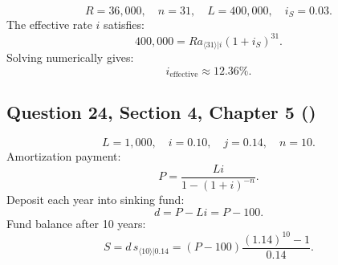 \documentclass[12pt, a4paper]{article}
\newcommand{\angl}[1]{\langle #1 \rangle}
\begin{document}
\[
R = 36{,}000, \quad n = 31, \quad L = 400{,}000, \quad i_S = 0.03.
\]
The effective rate \(i\) satisfies:
\[
400{,}000 = R a_{\angl{31}|i}(1 + i_S)^{31}.
\]
Solving numerically gives:
\[
i_{\text{effective}} \approx 12.36\%.
\]

\subsection*{Question 24, Section 4, Chapter 5  (\cite{toi3rd})}

\[
L = 1{,}000, \quad i = 0.10, \quad j = 0.14, \quad n = 10.
\]
Amortization payment:
\[
P = \frac{L i}{1 - (1+i)^{-n}}.
\]
Deposit each year into sinking fund:
\[
d = P - L i = P - 100.
\]
Fund balance after 10 years:
\[
S = d \, s_{\angl{10}|0.14} = (P - 100)\frac{(1.14)^{10} - 1}{0.14}.
\]


\newpage
\printbibliography
\end{document}
